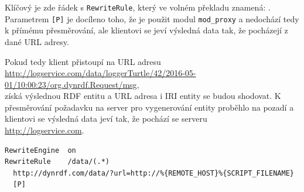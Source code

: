 \documentclass[thesis=B,czech]{FITthesis}[2012/06/26]
\begin{document}
  Klíčový je zde řádek s \texttt{RewriteRule}, který ve volném překladu znamená: .  Parametrem \texttt{[P]} je docíleno toho, že je použit modul 
  \texttt{mod\_proxy} \cite{mod_proxy} a nedochází tedy k přímému přesměrování, ale klientovi se jeví výsledná data tak, že pocházejí z dané URL adresy.
  
  Pokud tedy klient přistoupí na URL adresu \url{http://logservice.com/data/loggerTurtle/42/2016-05-01/10:00:23/org.dynrdf.Request/msg},\\ získá výslednou RDF entitu
  a URL adresa i IRI entity se budou shodovat. K přesměrování požadavku na server pro vygenerování entity proběhlo na pozadí a klientovi se výsledná data jeví tak,
  že pochází se serveru\\ \url{http://logservice.com}.
  
  \begin{lstlisting}[float=htb,caption={Část konfigurace webového serveru Apache sloužící k přeposílání požadavků přes proxy},label=list:apache_config]
RewriteEngine  on
RewriteRule    /data/(.*)  
  http://dynrdf.com/data/?url=http://%{REMOTE_HOST}%{SCRIPT_FILENAME}  
  [P]

\end{lstlisting}
  
\end{document}
